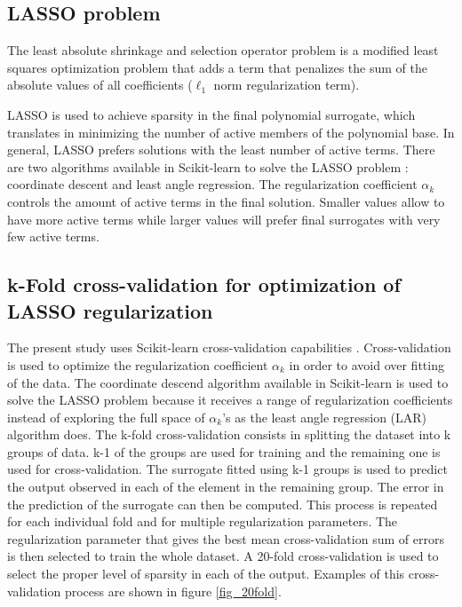 \documentclass[preprint,12pt]{elsarticle}
\begin{document}
\subsection{LASSO problem}

The least absolute shrinkage and selection operator problem \cite{tibshirani1996regression} is a modified least squares optimization problem that adds a term that penalizes the sum of the absolute values of all coefficients ($\ell_1$ norm regularization term).


LASSO is used to achieve sparsity in the final polynomial surrogate, which translates in minimizing the number of active members of the polynomial base. In general, LASSO prefers solutions with the least number of active terms. There are two algorithms available in Scikit-learn to solve the LASSO problem \cite{pedregosa2011scikit}: coordinate descent and least angle regression. The regularization coefficient $\alpha_k$ controls the amount of active terms in the final solution. Smaller values allow to have more active terms while larger values will prefer final surrogates with very few active terms.

\subsection{k-Fold cross-validation for optimization of LASSO regularization}


The present study uses Scikit-learn cross-validation capabilities \cite{pedregosa2011scikit}. Cross-validation is used to optimize the regularization coefficient $\alpha_k$ in order to avoid over fitting of the data. The coordinate descend algorithm available in Scikit-learn is used to solve the LASSO problem because it receives a range of regularization coefficients instead of exploring the full space of $\alpha_k$'s as the least angle regression (LAR) algorithm does. The k-fold cross-validation consists in splitting the dataset into k groups of data. k-1 of the groups are used for training and the remaining one is used for cross-validation. The surrogate fitted using k-1 groups is used to predict the output observed in each of the element in the remaining group. The error in the prediction of the surrogate can then be computed. This process is repeated for each individual fold and for multiple regularization parameters. The regularization parameter that gives the best mean cross-validation sum of errors is then selected to train the whole dataset. A 20-fold cross-validation is used to select the proper level of sparsity in each of the output. Examples of this cross-validation process are shown in figure \ref{fig_20fold}.
\end{document}
